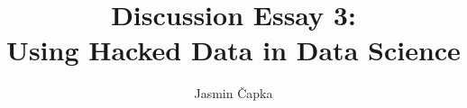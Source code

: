 \documentclass[11pt, a4paper]{article}
\begin{document}
    \title{Discussion Essay 3:\\Using Hacked Data in Data Science}
    \author{Jasmin Čapka}

    \maketitle

    

    \newpage
    \printbibliography
\end{document}
